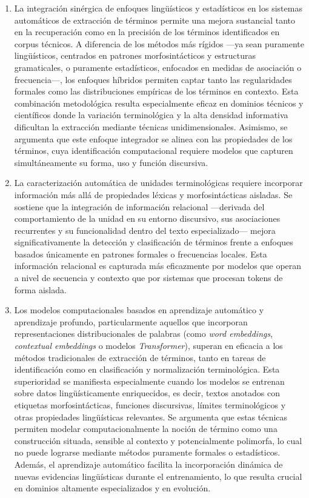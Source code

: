 \begin{enumerate}
    \item  La integración sinérgica de enfoques lingüísticos y estadísticos en los sistemas automáticos de extracción de términos permite una mejora sustancial tanto en la recuperación como en la precisión de los términos identificados en corpus técnicos. A diferencia de los métodos más rígidos —ya sean puramente lingüísticos, centrados en patrones morfosintácticos y estructuras gramaticales, o puramente estadísticos, enfocados en medidas de asociación o frecuencia—, los enfoques híbridos permiten captar tanto las regularidades formales como las distribuciones empíricas de los términos en contexto. Esta combinación metodológica resulta especialmente eficaz en dominios técnicos y científicos donde la variación terminológica y la alta densidad informativa dificultan la extracción mediante técnicas unidimensionales. Asimismo, se argumenta que este enfoque integrador se alinea con las propiedades  de los términos, cuya identificación computacional requiere modelos que capturen simultáneamente su forma, uso y función discursiva.
    \item La caracterización automática de unidades terminológicas requiere incorporar información más allá de propiedades léxicas y morfosintácticas aisladas. Se sostiene que la integración de información relacional —derivada del comportamiento de la unidad en su entorno discursivo, sus asociaciones recurrentes y su funcionalidad dentro del texto especializado— mejora significativamente la detección y clasificación de términos frente a enfoques basados únicamente en patrones formales o frecuencias locales. Esta información relacional es capturada más eficazmente por modelos que operan a nivel de secuencia y contexto que por sistemas que procesan tokens de forma aislada.
    \item  Los modelos computacionales basados en aprendizaje automático y aprendizaje profundo, particularmente aquellos que incorporan representaciones distribucionales de palabras (como \textit{word embeddings}, \textit{contextual embeddings} o modelos \textit{Transformer}), superan en eficacia a los métodos tradicionales de extracción de términos, tanto en tareas de identificación como en clasificación y normalización terminológica. Esta superioridad se manifiesta especialmente cuando los modelos se entrenan sobre datos lingüísticamente enriquecidos, es decir, textos anotados con etiquetas morfosintácticas, funciones discursivas, límites terminológicos y otras propiedades lingüísticas relevantes. Se argumenta que estas técnicas permiten modelar computacionalmente la noción de término como una construcción situada, sensible al contexto y potencialmente polimorfa, lo cual no puede lograrse mediante métodos puramente formales o estadísticos. Además, el aprendizaje automático facilita la incorporación dinámica de nuevas evidencias lingüísticas durante el entrenamiento, lo que resulta crucial en dominios altamente especializados y en evolución.

\end{enumerate}
